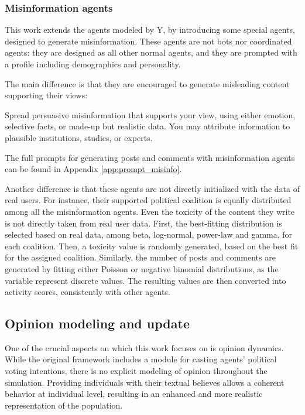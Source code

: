 


\subsubsection{Misinformation agents}
This work extends the agents modeled by Y, by introducing some special agents, designed to generate misinformation.
These agents are not bots nor coordinated agents: they are designed as all other normal agents, and they are prompted with a profile including demographics and personality.

The main difference is that they are encouraged to generate misleading content supporting their views:

\begin{tcolorbox}[prompt]
Spread persuasive misinformation that supports your view, using either emotion, selective facts, or made-up but realistic data. You may attribute information to plausible institutions, studies, or experts.
\end{tcolorbox}

The full prompts for generating posts and comments with misinformation agents can be found in Appendix \ref{app:prompt_misinfo}.

\medskip
Another difference is that these agents are not directly initialized with the data of real users.
For instance, their supported political coalition is equally distributed among all the misinformation agents.
Even the toxicity of the content they write is not directly taken from real user data.
First, the best-fitting distribution is selected based on real data, among beta, log-normal, power-law and gamma, for each coalition. Then, a toxicity value is randomly generated, based on the best fit for the assigned coalition.
Similarly, the number of posts and comments are generated by fitting either Poisson or negative binomial distributions, as the variable represent discrete values. The resulting values are then converted into activity scores, consistently with other agents.


\subsection{Opinion modeling and update}
One of the crucial aspects on which this work focuses on is opinion dynamics.
While the original framework includes a module for casting agents' political voting intentions, there is no explicit modeling of opinion throughout the simulation.
Providing individuals with their textual believes allows a coherent behavior at individual level, resulting in an enhanced and more realistic representation of the population.

